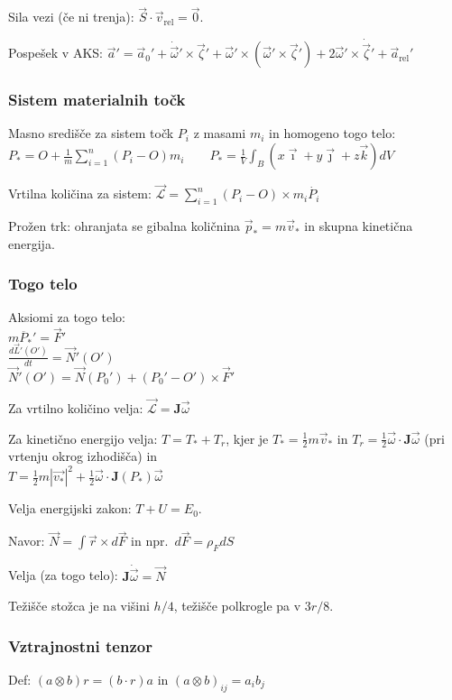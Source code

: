 \documentclass[a4paper,10pt]{article}
\theoremstyle{definition}
\newcommand{\vzeta}{\vec{\zeta}}
\newcommand{\dzeta}{\dot{\vzeta}}
\newcommand{\vomega}{\vec{\omega}}
\newcommand{\domega}{\dot{\vomega}}
\newcommand{\va}{\vec{a}}
\newcommand{\Pt}{P_{\ast}}
\begin{document}
Sila vezi (če ni trenja): $\vec{S} \cdot \vec{v}_{\operatorname{rel}} = \vec{0}.$

Pospešek v AKS: $\va' = \va_0' + \domega' \times \vzeta' + \vomega' \times (\vomega' \times \vzeta') + 2 \vomega'\times\dzeta' + \va_{\operatorname{rel}}'$

\subsubsection*{Sistem materialnih točk}
Masno središče za sistem točk $P_i$ z masami $m_i$ in homogeno togo telo: \\
$ \displaystyle \Pt = O + \frac1m \sum_{i=1}^n (P_i - O) m_i \qquad \Pt =
\frac1V \int_B (x\vec{\imath} + y\vec{\jmath} + z\vec{k})dV $

Vrtilna količina za sistem: $ \vec{\mathscr L} = \sum_{i=1}^{n} (P_i - O) \times m_i \dot{P_i}$

Prožen trk: ohranjata se gibalna količnina $\vec p_* = m\vec v_*$ in skupna kinetična energija.

\subsubsection*{Togo telo}
Aksiomi za togo telo: \\
$m\ddot{\Pt}' = \vec{F}'$ \\
$\displaystyle \frac{d\vec{L}'(O')}{dt} = \vec{N}'(O')$ \\
$\vec{N}'(O') = \vec{N}(P_0') + (P_0' - O') \times \vec{F}'$

Za vrtilno količino velja: $\vec{\mathscr L} = \mathbf{J} \vec{\omega}$

Za kinetično energijo velja:
$T = T_\ast + T_r$, kjer je $T_\ast = \frac12 m\vec{v}_\ast$ in $T_r = \frac12
\vomega \cdot \mathbf{J} \vomega$  (pri vrtenju okrog izhodišča) in \\ $T =
\frac{1}{2} m |\vec{v_*}|^2 + \frac{1}{2} \vec{\omega} \cdot \mathbf{J}(\Pt)
\vec{\omega}$

Velja energijski zakon: $T + U = E_0$.

Navor: $\vec{N} = \int \vec{r} \times d\vec{F}$ in npr.\ $d\vec{F} = \rho_F dS$

Velja (za togo telo): $\mathbf{J} \domega = \vec{N}$

Težišče stožca je na višini $h/4$, težišče polkrogle pa v $3 r / 8$.

\subsubsection*{Vztrajnostni tenzor}
Def: $(a \otimes b) r = (b \cdot r) a$ in $(a \otimes b)_{ij} = a_i b_j$
\end{document}
